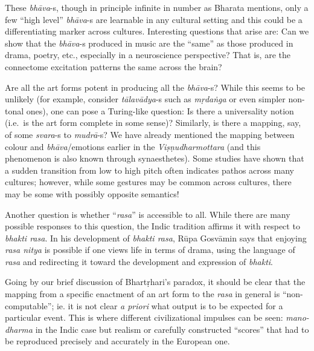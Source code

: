 These \textsl{bhāva}-s, though in principle infinite in number as Bharata mentions, only a few “high level” \textsl{bhāva}-s are learnable in any cultural setting and this could be a differentiating marker across cultures. Interesting questions that arise are: Can we show that the \hbox{\textsl{bhāva}-s} produced in music are the “same” as those produced in drama, poetry, etc., especially in a neuroscience perspective? That is, are the connectome excitation patterns the same across the brain?
\vskip 2pt

Are all the art forms potent in producing all the \textsl{bhāva}-s? While this seems to be unlikely (for example, consider \textsl{tālavādya}-s such as \textsl{mṛdaṅga} or even simpler non-tonal ones), one can pose a Turing-like question: Is there a universality notion (i.e.\ is the art form complete in some sense)? Similarly, is there a mapping, say, of some \hbox{\textsl{svara}-s} to \textsl{mudrā}-s? We have already mentioned the mapping between colour and \textsl{bhāva}/emotions earlier in the \textsl{Viṣṇudharmottara} (and this phenomenon is also known through synaesthetes). Some studies have shown that a sudden transition from low to high pitch often indicates pathos across many cultures; however, while some gestures may be common across cultures, there may be some with possibly opposite semantics!
\vskip 2pt

Another question is whether “\textsl{rasa}” is accessible to all. While there are many possible responses to this question, the Indic tradition affirms it with respect to \textsl{bhakti rasa}.  In his development of \textsl{bhakti rasa}, Rūpa Gosvāmin says that enjoying \textsl{rasa nitya} is possible if one views life in terms of drama, using the language of \textsl{rasa} and redirecting it toward the development and expression of \textsl{bhakti}.
\vskip 2pt

Going by our brief discussion of Bhartṛhari’s paradox, it should be clear that the mapping from a specific enactment of an art form to the \textsl{rasa} in general is “non-computable”; ie. it is not clear \textsl{a priori} what output is to be expected for a particular event. This is where different civilizational impulses can be seen: \textsl{mano-dharma} in the Indic case but realism or carefully constructed “scores” that had to be reproduced precisely and accurately in the European one. 
\vskip 2pt

